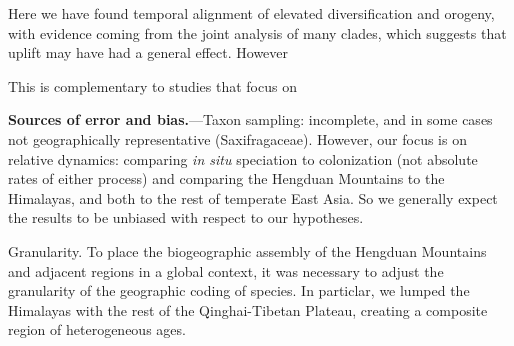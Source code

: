 Here we have found temporal alignment of elevated diversification and orogeny, with evidence coming from the joint analysis of many clades, which suggests that uplift may have had a general effect. However 

This is complementary to studies that focus on 

\textbf{Sources of error and bias.}---Taxon sampling: incomplete, and in some cases not geographically representative (Saxifragaceae). However, our focus is on relative dynamics: comparing \textit{in situ} speciation to colonization (not absolute rates of either process) and comparing the Hengduan Mountains to the Himalayas, and both to the rest of temperate East Asia. So we generally expect the results to be unbiased with respect to our hypotheses.

Granularity. To place the biogeographic assembly of the Hengduan Mountains and adjacent regions in a global context, it was necessary to adjust the granularity of the geographic coding of species. In particlar, we lumped the Himalayas with the rest of the Qinghai-Tibetan Plateau, creating a composite region of heterogeneous ages.



